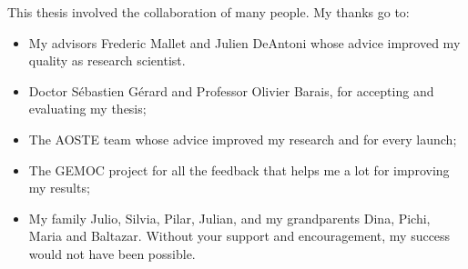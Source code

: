 \cleardoublepage


\begin{acknowledgements}
This thesis involved the collaboration of many people. My thanks go to:
\begin{itemize}
	\item My advisors Frederic Mallet and Julien DeAntoni whose advice improved my quality as research scientist.

	\item Doctor S\'ebastien G\'erard and Professor Olivier Barais, for accepting and evaluating my thesis;
	
		\item The AOSTE team whose advice improved my research and for every launch;
		\item The GEMOC project for all the feedback that helps me a lot for improving my results; 
		
	\item My family Julio, Silvia, Pilar, Julian, and my grandparents Dina, Pichi, Maria and Baltazar. Without your support and encouragement, my success would not have been possible.   
\end{itemize}








\end{acknowledgements}